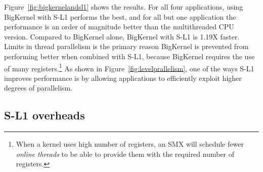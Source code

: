 Figure~\ref{fig:bigkernelandsl1} shows the results.
For all four applications, using BigKernel with S-L1 performs the best,
and for all but one application the performance is an order of magnitude better than the multithreaded CPU version.
Compared to BigKernel alone, BigKernel with S-L1 is 1.19X faster.
Limits in thread parallelism is the primary reason BigKernel is prevented from performing better when combined with
S-L1, because BigKernel requires the use of many registers.\footnote{When a kernel uses high number of registers, an SMX
will schedule fewer {\it online threads} to be able to provide them with the required number of registers.} As shown in
Figure~\ref{fig:levelprallelism}, one of the ways S-L1 improves performance is by allowing applications to efficiently
exploit higher degrees of parallelism.







\subsection{S-L1 overheads}
\label{sec:sl1overheadsresults}

